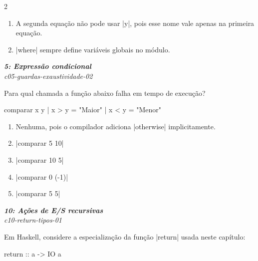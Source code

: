 \documentclass[a4paper,10pt,brazil]{article}
\begin{document}
\begin{multicols}{2}
\begin{enumerate}
  \item A segunda equação não pode usar \haskellinline|y|, pois esse nome vale apenas na primeira equação.

  \item \haskellinline|where| sempre define variáveis globais no módulo.


\end{enumerate}

\begin{flushright}
  \footnotesize
  \textit{\textbf{5: Expressão condicional}}\\
  \textit{c05-guardas-exaustividade-02}\\

\end{flushright}
Para qual chamada a função abaixo falha em tempo de execução?
\begin{haskellcode}
comparar x y
  | x > y = "Maior"
  | x < y = "Menor"
\end{haskellcode}

\begin{enumerate}
  \item Nenhuma, pois o compilador adiciona \haskellinline|otherwise| implicitamente.

  \item \haskellinline|comparar 5 10|

  \item \haskellinline|comparar 10 5|

  \item \haskellinline|comparar 0 (-1)|

  \item \haskellinline|comparar 5 5|


\end{enumerate}

\begin{flushright}
  \footnotesize
  \textit{\textbf{10: Ações de E/S recursivas}}\\
  \textit{c10-return-tipos-01}\\

\end{flushright}
Em Haskell, considere a especialização da função \haskellinline|return| usada neste capítulo:

\begin{haskellcode}
return :: a -> IO a
\end{haskellcode}


\end{multicols}
\end{document}
